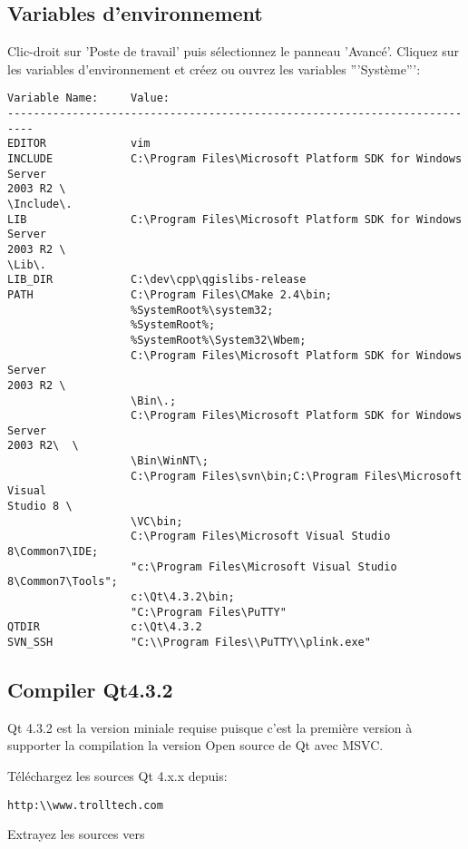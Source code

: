 \subsection{Variables d'environnement}
Clic-droit sur 'Poste de travail' puis s\'electionnez le panneau 'Avanc\'e'. Cliquez sur les variables d'environnement et cr\'eez ou ouvrez les variables '''Syst\`eme''':

\begin{verbatim}
Variable Name:     Value:
--------------------------------------------------------------------------
EDITOR             vim
INCLUDE            C:\Program Files\Microsoft Platform SDK for Windows Server
2003 R2 \
\Include\.
LIB                C:\Program Files\Microsoft Platform SDK for Windows Server
2003 R2 \
\Lib\.
LIB_DIR            C:\dev\cpp\qgislibs-release
PATH               C:\Program Files\CMake 2.4\bin;
                   %SystemRoot%\system32;
                   %SystemRoot%;
                   %SystemRoot%\System32\Wbem;
                   C:\Program Files\Microsoft Platform SDK for Windows Server
2003 R2 \
                   \Bin\.;
                   C:\Program Files\Microsoft Platform SDK for Windows Server
2003 R2\  \
                   \Bin\WinNT\;
                   C:\Program Files\svn\bin;C:\Program Files\Microsoft Visual
Studio 8 \
                   \VC\bin;
                   C:\Program Files\Microsoft Visual Studio 8\Common7\IDE;
                   "c:\Program Files\Microsoft Visual Studio 8\Common7\Tools";
                   c:\Qt\4.3.2\bin;
                   "C:\Program Files\PuTTY"
QTDIR              c:\Qt\4.3.2
SVN_SSH            "C:\\Program Files\\PuTTY\\plink.exe"
\end{verbatim}

\subsection{Compiler Qt4.3.2}
Qt 4.3.2 est la version miniale requise puisque c'est la premi\`ere version \`a supporter la compilation la version Open source de Qt avec MSVC.

T\'el\'echargez les sources Qt 4.x.x depuis:

\begin{verbatim}
http:\\www.trolltech.com
\end{verbatim}

Extrayez les sources vers 

